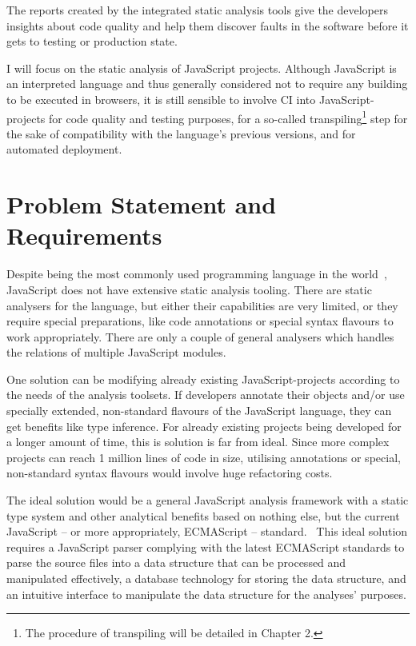 The reports created by the integrated static analysis tools give the developers insights about code quality and help them discover faults in the software before it gets to testing or production state.

I will focus on the static analysis of JavaScript projects. Although JavaScript is an interpreted language and thus generally considered not to require any building to be executed in browsers, it is still sensible to involve CI into JavaScript-projects for code quality and testing purposes, for a so-called transpiling\footnote{The procedure of transpiling will be detailed in Chapter 2.} step for the sake of compatibility with the language's previous versions, and for automated deployment.


\section{Problem Statement and Requirements}

Despite being the most commonly used programming language in the world~\cite{javascriptstackoverflow}, JavaScript does not have extensive static analysis tooling. There are static analysers for the language, but either their capabilities are very limited, or they require special preparations, like code annotations or special syntax flavours to work appropriately. There are only a couple of general analysers which handles the relations of multiple JavaScript modules.

One solution can be modifying already existing JavaScript-projects according to the needs of the analysis toolsets. If developers annotate their objects and/or use specially extended, non-standard flavours of the JavaScript language, they can get benefits like type inference. For already existing projects being developed for a longer amount of time, this is solution is far from ideal. Since more complex projects can reach 1 million lines of code in size, utilising annotations or special, non-standard syntax flavours would involve huge refactoring costs.

The ideal solution would be a general JavaScript analysis framework with a static type system and other analytical benefits based on nothing else, but the current JavaScript – or more appropriately, ECMAScript – standard.~\cite{ecmascriptstandard} This ideal solution requires a JavaScript parser complying with the latest ECMAScript standards to parse the source files into a data structure that can be processed and manipulated effectively, a database technology for storing the data structure, and an intuitive interface to manipulate the data structure for the analyses' purposes.

